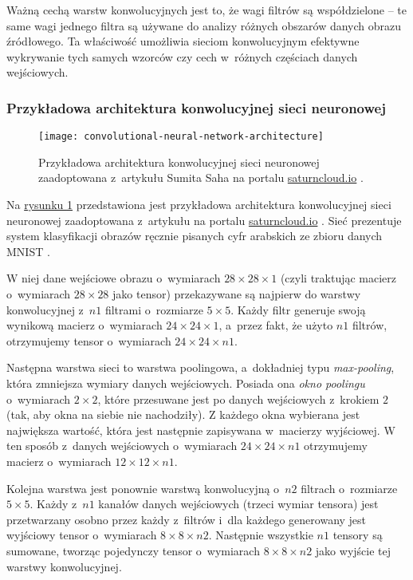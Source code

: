 {Ważną cechą warstw konwolucyjnych jest to, że wagi filtrów są współdzielone -- te same wagi jednego filtra są używane do analizy różnych obszarów danych obrazu źródłowego.
Ta właściwość umożliwia sieciom konwolucyjnym efektywne wykrywanie tych samych wzorców czy cech w~różnych częściach danych wejściowych.

\subsubsection{Przykładowa architektura konwolucyjnej sieci neuronowej}

\begin{figure}[ht]
  \texttt{[image: convolutional-neural-network-architecture]}
  \caption[Przykładowa architektura konwolucyjnej sieci neuronowej]{Przykładowa architektura konwolucyjnej sieci neuronowej zaadoptowana z~artykułu Sumita Saha na portalu \url{saturncloud.io} \cite{saha2018comprehensive}.}
  \label{fig:convolutional-neural-network-architecture}
\end{figure}

Na \hyperref[fig:convolutional-neural-network-architecture]{rysunku \ref*{fig:convolutional-neural-network-architecture}} przedstawiona jest przykładowa architektura konwolucyjnej sieci neuronowej zaadoptowana z~artykułu na portalu \url{saturncloud.io} \cite{saha2018comprehensive}.
Sieć prezentuje system klasyfikacji obrazów ręcznie pisanych cyfr arabskich ze zbioru danych MNIST \cite{mnist}.

W niej dane wejściowe obrazu o~wymiarach $28 \times 28 \times 1$ (czyli traktując macierz o~wymiarach $28 \times 28$ jako tensor) przekazywane są najpierw do warstwy konwolucyjnej z~$n1$ filtrami o~rozmiarze $5 \times 5$.
Każdy filtr generuje swoją wynikową macierz o~wymiarach $24 \times 24 \times 1$, a~przez fakt, że użyto $n1$ filtrów, otrzymujemy tensor o~wymiarach $24 \times 24 \times n1$.

Następna warstwa sieci to warstwa poolingowa, a~dokładniej typu \emph{max-pooling}, która zmniejsza wymiary danych wejściowych.
Posiada ona \emph{okno poolingu} o~wymiarach $2 \times 2$, które przesuwane jest po danych wejściowych z~krokiem $2$ (tak, aby okna na siebie nie nachodziły).
Z każdego okna wybierana jest największa wartość, która jest następnie zapisywana w~macierzy wyjściowej.
W ten sposób z~danych wejściowych o~wymiarach $24 \times 24 \times n1$ otrzymujemy macierz o~wymiarach $12 \times 12 \times n1$.

Kolejna warstwa jest ponownie warstwą konwolucyjną o~$n2$ filtrach o~rozmiarze $5 \times 5$.
Każdy z~$n1$ kanałów danych wejściowych (trzeci wymiar tensora) jest przetwarzany osobno przez każdy z~filtrów i~dla każdego generowany jest wyjściowy tensor o~wymiarach $8 \times 8 \times n2$.
Następnie wszystkie $n1$ tensory są sumowane, tworząc pojedynczy tensor o~wymiarach $8 \times 8 \times n2$ jako wyjście tej warstwy konwolucyjnej.

}
